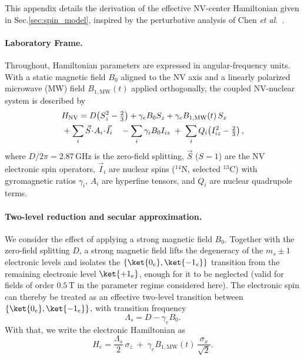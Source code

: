 \documentclass[
  aps,
  pra,
  reprint,            %
  superscriptaddress, %
  amsmath,amssymb,
  notitlepage
]{revtex4-2}
\begin{document}
This appendix details the derivation of the effective NV-center Hamiltonian given in Sec.\ref{sec:spin_model}, inspired by the perturbative analysis of Chen \emph{et al.}~\cite{Chen}.


\paragraph{Laboratory Frame.}
Throughout, Hamiltonian parameters are expressed in angular-frequency units. With a static magnetic field $B_0$ aligned to the NV axis and a linearly polarized microwave (MW) field $B_{1,\mathrm{MW}}(t)$ applied orthogonally, the coupled NV-nuclear system is described by
\begin{equation}
\begin{aligned}
H_{\mathrm{NV}}
&= D\!\left(S_z^2-\tfrac{2}{3}\right)
+ \gamma_e B_0 S_z
+ \gamma_e B_{1,\mathrm{MW}}(t)\,S_x\\
&\hspace{-0.7cm}+ \sum_i \vec{S}\!\cdot\! A_i \!\cdot\! \vec{I}_i 
\quad - \sum_i \gamma_i B_0 I_{iz}
\;+\; \sum_i Q_i\!\left(I_{iz}^2-\tfrac{2}{3}\right),
\end{aligned}
\label{eq:H_full}
\end{equation}
where $D/2\pi=2.87\,\mathrm{GHz}$ is the zero-field splitting, $\vec S$ ($S=1$) are the NV electronic spin operators, $\vec I_i$ are nuclear spins ($^{14}$N, selected $^{13}$C) with gyromagnetic ratios $\gamma_i$, $A_i$ are hyperfine tensors, and $Q_i$ are nuclear quadrupole terms.\\

\paragraph{Two-level reduction and secular approximation.}
We consider the effect of applying a strong magnetic field $B_0$. Together with the zero-field splitting $D$, a strong magnetic field lifts the degeneracy of the $m_s\pm1$ electronic levels and isolates the $\{\ket{0_e},\ket{-1_e}\}$ transition from the remaining electronic level $\ket{+1_e}$, enough for it to be neglected (valid for fields of order $0.5\,$T in the parameter regime considered here). The electronic spin can thereby be treated as an effective two-level transition between $\{\ket{0_e},\ket{-1_e}\}$, with transition frequency
\[
\Lambda_s = D - \gamma_e B_0.
\]
With that, we write the electronic Hamiltonian as
\begin{equation}
H_e = \frac{\Lambda_s}{2}\,\sigma_z \;+\; \gamma_e B_{1,\mathrm{MW}}(t)\,\frac{\sigma_x}{\sqrt{2}}.
\label{eq:He_def}
\end{equation}
\end{document}
